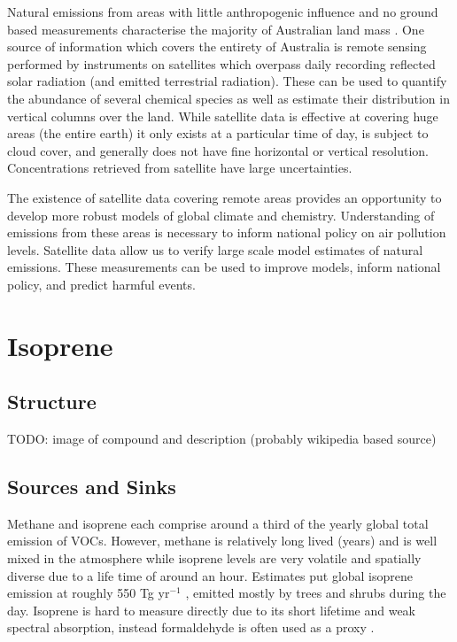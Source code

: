     Natural emissions from areas with little anthropogenic influence and no ground based measurements characterise the majority of Australian land mass \citep{VanDerA2008}.
    One source of information which covers the entirety of Australia is remote sensing performed by instruments on satellites which overpass daily recording reflected solar radiation (and emitted terrestrial radiation).
    These can be used to quantify the abundance of several chemical species as well as estimate their distribution in vertical columns over the land.
    While satellite data is effective at covering huge areas (the entire earth) it only exists at a particular time of day, is subject to cloud cover, and generally does not have fine horizontal or vertical resolution.
    Concentrations retrieved from satellite have large uncertainties.

    The existence of satellite data covering remote areas provides an opportunity to develop more robust models of global climate and chemistry.
    Understanding of emissions from these areas is necessary to inform national policy on air pollution levels.
    Satellite data allow us to verify large scale model estimates of natural emissions.
    These measurements can be used to improve models, inform national policy, and predict harmful events.

\section{Isoprene}
\label{ch1:sec:isoprene}

  \subsection{Structure}
    TODO: image of compound and description (probably wikipedia based source)

  \subsection{Sources and Sinks}
    Methane and isoprene each comprise around a third of the yearly global total emission of VOCs.
    However, methane is relatively long lived (years) and is well mixed in the atmosphere while isoprene levels are very volatile and spatially diverse due to a life time of around an hour. Estimates put global isoprene emission at roughly 550 Tg yr$^{-1}$ \citep{Guenther2006,Monks2015}, emitted mostly by trees and shrubs during the day.
    Isoprene is hard to measure directly due to its short lifetime and weak spectral absorption, instead formaldehyde is often used as a proxy \citep{Marais_2012,bauwens2013satellite,Kefauver2014}.

